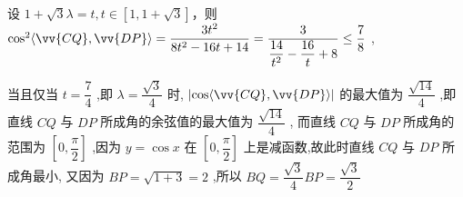 \begin{enumerate}
\begin{jieda}
        设 $1 + \sqrt{3}\lambda  = t,t \in  \left\lbrack  {1,1 + \sqrt{3}}\right\rbrack$，则 ${\cos }^{2}\langle \vv{CQ},\vv{DP}\rangle  = \dfrac{3{t}^{2}}{8{t}^{2} - {16t} + {14}} = \dfrac{3}{\dfrac{14}{{t}^{2}} - \dfrac{16}{t} + 8} \leq  \dfrac{7}{8}$ ,

        当且仅当 $t = \dfrac{7}{4}$ ,即 $\lambda  = \dfrac{\sqrt{3}}{4}$ 时, $\left| {\cos \langle \vv{CQ},\vv{DP}\rangle }\right|$ 的最大值为 $\dfrac{\sqrt{14}}{4}$ ,即直线 ${CQ}$ 与 ${DP}$ 所成角的余弦值的最大值为 $\dfrac{\sqrt{14}}{4}$ , 而直线 ${CQ}$ 与 ${DP}$ 所成角的范围为 $\left\lbrack  {0,\dfrac{\pi }{2}}\right\rbrack$ ,因为 $y = \cos x$ 在 $\left\lbrack  {0,\dfrac{\pi }{2}}\right\rbrack$ 上是减函数,故此时直线 ${CQ}$ 与 ${DP}$ 所成角最小, 又因为 ${BP} = \sqrt{1 + 3} = 2$ ,所以 ${BQ} = \dfrac{\sqrt{3}}{4}{BP} = \dfrac{\sqrt{3}}{2}$
    \end{jieda}

\end{enumerate}

